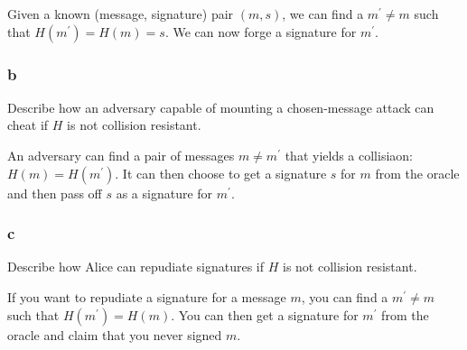\documentclass[11pt]{article}
\begin{document}
Given a known (message, signature) pair $(m, s)$, we can find a $m^\prime \neq m$ such that $H(m^\prime) = H(m) = s$. We can now forge a signature for $m^\prime$.

\subsubsection{b} Describe how an adversary capable of mounting a chosen-message attack can cheat if $H$ is not collision resistant.

An adversary can find a pair of messages $m \neq m^\prime$ that yields a collisiaon: $H(m) = H(m^\prime)$. It can then choose to get a signature $s$ for $m$ from the oracle and then pass off $s$ as a signature for $m^\prime$.

\subsubsection{c} Describe how Alice can repudiate signatures if $H$ is not collision resistant.

If you want to repudiate a signature for a message $m$, you can find a $m^\prime \neq m$ such that $H(m^\prime) = H(m)$. You can then get a signature for $m^\prime$ from the oracle and claim that you never signed $m$.
\end{document}
